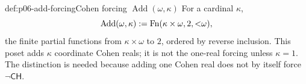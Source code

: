 \begin{hbdefinition}{def:p06-add-forcing}{Cohen forcing \(\operatorname{Add}(\omega,\kappa)\)}
For a cardinal \(\kappa\),
\[
  \operatorname{Add}(\omega,\kappa)
  \mathrel{:=}
  \operatorname{Fn}(\kappa\times\omega,2,{<}\omega),
\]
the finite partial functions from \(\kappa\times\omega\) to \(2\), ordered by
reverse inclusion.  This poset adds \(\kappa\) coordinate Cohen reals; it is
not the one-real forcing unless \(\kappa=1\).  The distinction is needed
because adding one Cohen real does not by itself force \(\neg\mathsf{CH}\).
\end{hbdefinition}
